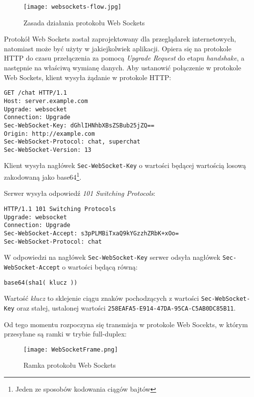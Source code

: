 \begin{figure}[H]
  \centering
    \texttt{[image: websockets-flow.jpg]}
  \caption[Zasada działania protokołu Web Sockets]{Zasada działania protokołu Web Sockets}
\end{figure}

Protokół Web Sockets został zaprojektowany dla przeglądarek internetowych, natomiast może być użyty w jakiejkolwiek aplikacji. Opiera się na protokole HTTP do czasu przełączenia za pomocą \emph{Upgrade Request} do etapu \emph{handshake}, a następnie na właściwą wymianę danych. Aby ustanowić połączenie w protokole Web Sockets, klient wysyła żądanie w protokole HTTP:

\lstset{language=Octave}
\begin{lstlisting}
GET /chat HTTP/1.1
Host: server.example.com
Upgrade: websocket
Connection: Upgrade
Sec-WebSocket-Key: dGhlIHNhbXBsZSBub25jZQ==
Origin: http://example.com
Sec-WebSocket-Protocol: chat, superchat
Sec-WebSocket-Version: 13
\end{lstlisting}

Klient wysyła nagłówek \lstinline{Sec-WebSocket-Key} o wartości będącej wartością losową zakodowaną jako base64\footnote{Jeden ze sposobów kodowania ciągów bajtów}.

Serwer wysyła odpowiedź \emph{101 Switching Protocols}:

\lstset{language=Octave}
\begin{lstlisting}
HTTP/1.1 101 Switching Protocols
Upgrade: websocket
Connection: Upgrade
Sec-WebSocket-Accept: s3pPLMBiTxaQ9kYGzzhZRbK+xOo=
Sec-WebSocket-Protocol: chat
\end{lstlisting}

W odpowiedzi na nagłówek \lstinline{Sec-WebSocket-Key} serwer odsyła nagłówek \lstinline{Sec-WebSocket-Accept} o wartości będącą równą:

\vspace*{1\baselineskip}
\lstinline{base64(sha1( klucz ))}
\vspace*{1\baselineskip}

Wartość \emph{klucz} to sklejenie ciągu znaków pochodzących z wartości \lstinline{Sec-WebSocket-Key} oraz stałej, ustalonej wartości \lstinline{258EAFA5-E914-47DA-95CA-C5AB0DC85B11}.

Od tego momentu rozpoczyna się transmisja w protokole Web Socekts, w którym przesyłane są ramki w trybie full-duplex:

\begin{figure}[H]
  \centering
    \texttt{[image: WebSocketFrame.png]}
  \caption[Ramka protokołu Web Sockets]{Ramka protokołu Web Sockets}
\end{figure}

